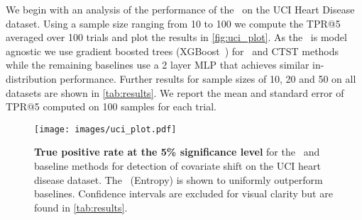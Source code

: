 We begin with an analysis of the performance of the \method\ on the UCI Heart Disease dataset.
Using a sample size ranging from 10 to 100 we compute the TPR@5 averaged over 100 trials and plot the results in \autoref{fig:uci_plot}.
As the \method\ is model agnostic we use gradient boosted trees (XGBoost~\citep{xgb})
for \method\ and CTST methods while the remaining baselines use a 2 layer MLP that achieves similar in-distribution performance.
Further results for sample sizes of 10, 20 and 50 on all datasets are shown in \autoref{tab:results}.
We report the mean and standard error of TPR@5 computed on 100 samples for each trial.

\begin{figure}[!htb]
    \vspace{-10mm}
    \centering
    \texttt{[image: images/uci\_plot.pdf]}
    \vspace{-5mm}
    \caption{\small \textbf{True positive rate at the 5\% significance level} for the \method\ and baseline methods for detection of covariate shift on the UCI heart disease dataset.
    The \method\ (Entropy) is shown to uniformly outperform baselines.
    Confidence intervals are excluded for visual clarity but are found in \autoref{tab:results}.}
    \label{fig:uci_plot}
\end{figure}

